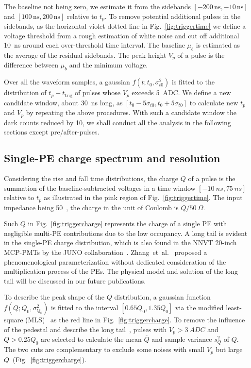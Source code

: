 The baseline not being zero, we estimate it from the sidebands $[-200\,\mathrm{ns},-10\,\mathrm{ns}]$ and $[100\,\mathrm{ns},200\,\mathrm{ns}]$ relative to $t_p$. To remove potential additional pulses in the sidebands, as the horizontal violet dotted line in Fig.~\ref{fig:triggertime} we define a voltage threshold from a rough estimation of white noise and cut off additional \SI{10}{ns} around each over-threshold time interval. The baseline $\mu_b$ is estimated as the average of the residual sidebands. The peak height $V_p$ of a pulse is the difference between $\mu_b$ and the minimum voltage.

Over all the waveform samples, a gaussian $f(t;t_0,\sigma_{t0}^2)$ is fitted to the distribution of $t_p-t_{\mathrm{trig}}$ of pulses whose $V_p$ exceeds \SI{5}{ADC}. We define a new candidate window, about \SI{30}{ns} long, as $[t_0-5\sigma_{t0}, t_0+5\sigma_{t0}]$ to calculate new $t_p$ and $V_p$ by repeating the above procedures.  With such a candidate window the dark counts reduced by 10, we shall conduct all the analysis in the following sections except pre/after-pulses.

\subsection{Single-PE charge spectrum and resolution}
\label{sec:noisepeak}

Considering the rise and fall time distributions, the charge $Q$ of a pulse is the summation of the baseline-subtracted voltages in a time window $[\SI{-10}{ns}, \SI{75}{ns}]$ relative to $t_p$ as illustrated in the pink region of Fig.~\ref{fig:triggertime}. The input impedance being \SI{50}{\Omega}~\cite{CAENV1751}, the charge in the unit of Coulomb is $Q/\SI{50}{\Omega}$.

Such $Q$ in Fig.~\ref{fig:triggercharge} represents the charge of a single PE with negligible multi-PE contributions due to the low occupancy. A long tail is evident in the single-PE charge distribution, which is also found in the NNVT 20-inch MCP-PMTs by the JUNO collaboration~\cite{JUNOMassTesting}. Zhang~et~al.~\cite{JUNOLongtail} proposed a phenomenological parameterization without dedicated consideration of the multiplication process of the PEs. The physical model and solution of the long tail will be discussed in our future publications.

To describe the peak shape of the $Q$ distribution, a gaussian function $f(Q;Q_0,\sigma^2_{Q_0})$ is fitted to the interval $[0.65Q_0, 1.35Q_0]$ via the modified least-square (MLS)~\cite{Cowan1998StatisticalDA} as the red line in Fig.~\ref{fig:triggercharge}. To remove the influence of the pedestal and describe the long tail~\cite{JUNOLongtail}, pulses with $V_p>\SI{3}{ADC}$ and $Q>0.25Q_0$ are selected to calculate the mean $\overline{Q}$ and sample variance $s^2_{Q}$ of $Q$.
The two cuts are complementary to exclude some noises with small $V_p$ but large $Q$~(Fig.~\ref{fig:triggercharge}).

